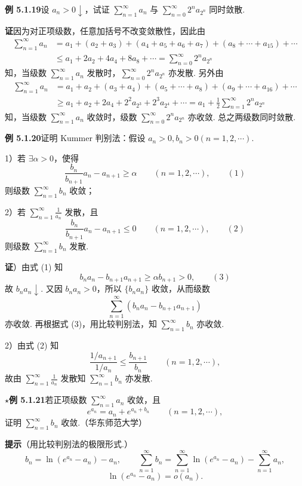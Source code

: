 \documentclass[UTF8, 12pt, fontset=fandol, oneside]{ctexart}
\begin{document}
\noindent\textbf{例 5.1.19}\quad 设 $a_n>0\downarrow$，试证 $\displaystyle\sum_{n=1}^\infty a_n$ 与 $\displaystyle\sum_{n=0}^\infty 2^n a_{2^n}$ 同时敛散.

\noindent\textbf{证}\quad 因为对正项级数，任意加括号不改变敛散性，因此由
\[
\begin{aligned}
\sum_{n=1}^\infty a_n
&=a_1+(a_2+a_3)+(a_4+a_5+a_6+a_7)+(a_8+\cdots+a_{15})+\cdots\\
&\le a_1+2a_2+4a_4+8a_8+\cdots
=\sum_{n=0}^\infty 2^n a_{2^n}
\end{aligned}
\]
知，当级数 $\displaystyle\sum_{n=1}^\infty a_n$ 发散时，$\displaystyle\sum_{n=0}^\infty 2^n a_{2^n}$ 亦发散. 另外由
\[
\begin{aligned}
\sum_{n=1}^\infty a_n
&=a_1+a_2+(a_3+a_4)+(a_5+\cdots+a_8)+(a_9+\cdots+a_{16})+\cdots\\
&\ge a_1+a_2+2a_4+2^2a_{2^3}+2^3a_{2^4}+\cdots
=a_1+\frac12\sum_{n=1}^\infty2^n a_{2^n}
\end{aligned}
\]
知，当级数 $\displaystyle\sum_{n=1}^\infty a_n$ 收敛时，级数 $\displaystyle\sum_{n=0}^\infty2^n a_{2^n}$ 亦收敛. 总之两级数同时敛散.

\noindent\textbf{例 5.1.20}\quad 证明 Kummer 判别法：假设 $a_n>0,b_n>0(n=1,2,\cdots)$.

1）若 $\exists\alpha>0$，使得
\[
  \frac{b_n}{b_{n+1}}a_n-a_{n+1}\ge\alpha\qquad(n=1,2,\cdots),
\qquad(1)
\]
则级数 $\displaystyle\sum_{n=1}^\infty b_n$ 收敛；

2）若 $\displaystyle\sum_{n=1}^\infty\frac1{a_n}$ 发散，且
\[
  \frac{b_n}{b_{n+1}}a_n-a_{n+1}\le0\qquad(n=1,2,\cdots),
\qquad(2)
\]
则级数 $\displaystyle\sum_{n=1}^\infty b_n$ 发散.

\noindent\textbf{证}）由式 (1) 知
\[
  b_na_n-b_{n+1}a_{n+1}\ge\alpha b_{n+1}>0,
\qquad(3)
\]
故 $b_na_n\downarrow$. 又因 $b_na_n>0$，所以 $\{b_na_n\}$ 收敛，从而级数
\[
  \sum_{n=1}^\infty(b_na_n-b_{n+1}a_{n+1})
\]
亦收敛. 再根据式 (3)，用比较判别法，知 $\displaystyle\sum_{n=1}^\infty b_n$ 亦收敛.

2）由式 (2) 知
\[
  \frac{1/a_{n+1}}{1/a_n}\le\frac{b_{n+1}}{b_n}\qquad(n=1,2,\cdots),
\]
故由 $\displaystyle\sum_{n=1}^\infty\frac1{a_n}$ 发散知 $\displaystyle\sum_{n=1}^\infty b_n$ 亦发散.

\noindent\textbf{$\star$例 5.1.21}\quad 若正项级数 $\displaystyle\sum_{n=1}^\infty a_n$ 收敛，且
\[
  e^{a_n}=a_n+e^{a_n+b_n}\qquad(n=1,2,\cdots),
\]
证明 $\displaystyle\sum_{n=1}^\infty b_n$ 收敛.（华东师范大学）

\noindent\textbf{提示}\quad （用比较判别法的极限形式.）
\[
  b_n=\ln(e^{a_n}-a_n)-a_n,\qquad
  \sum_{n=1}^\infty b_n=\sum_{n=1}^\infty\ln(e^{a_n}-a_n)-\sum_{n=1}^\infty a_n,
\]
\[
  \ln(e^{a_n}-a_n)=o(a_n).
\]
\end{document}
